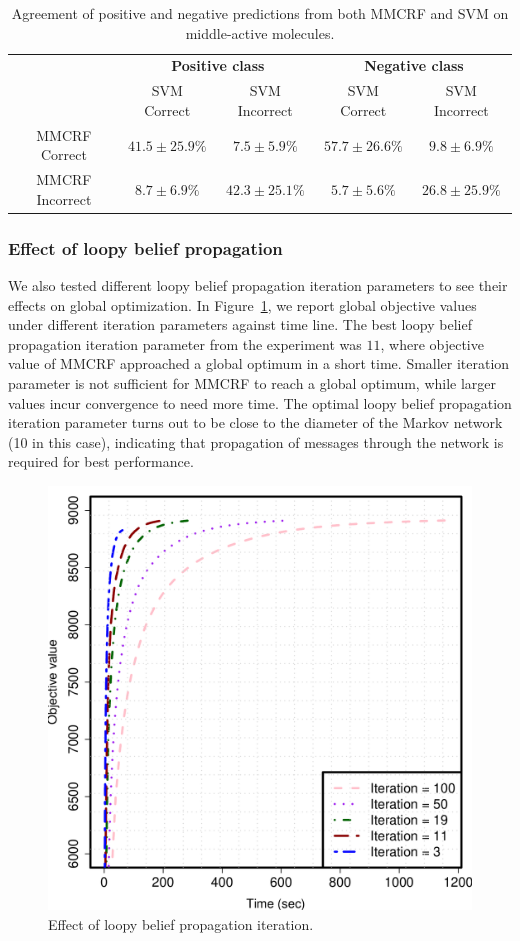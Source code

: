\documentclass[english]{tktltiki}
\begin{document}
\begin{table}[t]\small
\begin{tabular}{|c||c|c||c|c|} \hline
 &  \multicolumn{2}{|c||}{\bf Positive class} &  \multicolumn{2}{|c|}{\bf Negative class}\\ \cline{2-5}
 	                       & SVM Correct & SVM Incorrect & SVM Correct & SVM Incorrect \\  \hline
MMCRF  Correct  & $41.5 \pm 25.9\%$ & $7.5 \pm 5.9\%$ & $57.7 \pm 26.6\%$ & $9.8 \pm 6.9\%$ \\ \hline
MMCRF Incorrect & $8.7 \pm 6.9\%$ & $42.3 \pm 25.1\%$ & $5.7 \pm 5.6\%$ &  $26.8 \pm 25.9\%$ \\ \hline
\end{tabular} 
\caption[Prediction agreements from MMCRF and SVM 3.]{Agreement of positive and negative predictions from both MMCRF and SVM on middle-active molecules.}
\label{agreement_3}
\end{table}




\subsubsection{Effect of loopy belief propagation}

We also tested different loopy belief propagation iteration parameters to see their effects on global optimization. In Figure~\ref{lbp_effect}, we report global objective values under different iteration parameters against time line. The best loopy belief propagation iteration parameter from the experiment was $11$, where objective value of MMCRF approached a global optimum in a short time. Smaller iteration parameter is not sufficient for MMCRF to reach a global optimum, while larger values incur convergence to need more time. The optimal loopy belief propagation iteration parameter turns out to be close to the diameter of the Markov network (10 in this case), indicating that propagation of messages through the network is required for best performance.

\begin{figure}
\begin{center}
\centering
\includegraphics[width=0.6\columnwidth]{./plots/lbp_effect.pdf}
\caption[Effect of LBP parameter of MMCRF.]{Effect of loopy belief propagation iteration.}
\label{lbp_effect}
\end{center}
\end{figure}
\end{document}
